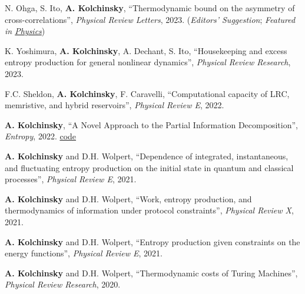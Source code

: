 N. Ohga, S. Ito, \textbf{A. Kolchinsky}, ``Thermodynamic bound on the asymmetry of cross-correlations'', \emph{Physical Review Letters}, 2023. (\emph{Editors' Suggestion}; \emph{Featured in \href{https://physics.aps.org/articles/v16/142}{Physics}})  

K. Yoshimura, \textbf{A. Kolchinsky}, A. Dechant, S. Ito, ``Housekeeping and excess entropy production for general nonlinear dynamics'', 
\emph{Physical Review Research}, 2023.  

F.C. Sheldon, \textbf{A. Kolchinsky}, F. Caravelli, ``Computational capacity of LRC, memristive, and hybrid reservoirs'', \emph{Physical Review E}, 2022.  

\textbf{A. Kolchinsky}, ``A Novel Approach to the Partial Information Decomposition'', \emph{Entropy}, 2022.
 \href{https://github.com/artemyk/redundancy}{code} 

\textbf{A. Kolchinsky} and D.H. Wolpert, ``Dependence of integrated, instantaneous, and fluctuating entropy production on the initial state in quantum and classical processes'', \emph{Physical Review E}, 2021.  

\textbf{A. Kolchinsky} and D.H. Wolpert, ``Work, entropy production, and thermodynamics of information under protocol constraints'', \emph{Physical Review X}, 2021.  

\textbf{A. Kolchinsky} and D.H. Wolpert, ``Entropy production given constraints on the energy functions'', \emph{Physical Review E}, 2021.  

\textbf{A. Kolchinsky} and D.H. Wolpert, ``Thermodynamic costs of Turing Machines'', \emph{Physical Review Research}, 2020. %
 

